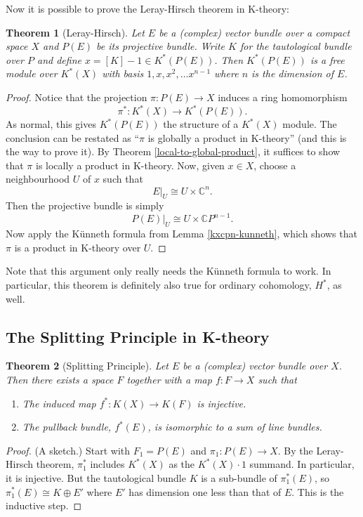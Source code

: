 \documentclass[a4paper,10pt]{article}
\theoremstyle{plain}%
\newtheorem{thm}{Theorem}
\theoremstyle{definition}
\theoremstyle{remark}
\newcommand{\CC}{\mathbb{C}}
\newcommand{\cp}{\CC P}   %
\newcommand{\CP}{\cp}     %
\begin{document}
Now it is possible to prove the Leray-Hirsch theorem in K-theory:
\begin{thm}[Leray-Hirsch]
  \label{leray-hirsch}
  Let $E$ be a (complex) vector bundle over a compact space $X$ and
  $P(E)$ be its projective bundle. Write $K$ for the tautological
  bundle over $P$ and define $x = [K] - 1 \in K^*(P(E))$. Then
  $K^*(P(E))$ is a free module over $K^*(X)$ with basis $1,x,x^2,\dots
  x^{n-1}$ where $n$ is the dimension of $E$.
\end{thm}
\begin{proof}
  Notice that the projection $\pi: P(E)\to X$ induces a ring
  homomorphism
  \begin{equation*}
    \pi^*: K^*(X)\to K^*(P(E)).
  \end{equation*}
  As normal, this gives $K^*(P(E))$ the structure of a $K^*(X)$
  module. The conclusion can be restated as ``$\pi$ is globally a
  product in K-theory'' (and this is the way to prove it). By Theorem
  \ref{local-to-global-product}, it suffices to show that $\pi$ is
  locally a product in K-theory. Now, given $x\in X$, choose a
  neighbourhood $U$ of $x$ such that
  \begin{equation*}
    E|_U \cong U \times \CC^n.
  \end{equation*}
  Then the projective bundle is simply
  \begin{equation*}
    P(E)|_U \cong U \times \CP^{n-1}.
  \end{equation*}
  Now apply the K\"unneth formula from Lemma \ref{kxcpn-kunneth},
  which shows that $\pi$ is a product in K-theory over $U$.
\end{proof}
Note that this argument only really needs the K\"unneth formula to
work. In particular, this theorem is definitely also true for ordinary
cohomology, $H^*$, as well.

\subsection{The Splitting Principle in K-theory}

\begin{thm}[Splitting Principle]
  Let $E$ be a (complex) vector bundle over $X$. Then there exists a
  space $F$ together with a map $f: F\to X$ such that
  \begin{enumerate}
  \item The induced map $f^*: K(X) \to K(F)$ is injective.
  \item The pullback bundle, $f^*(E)$, is isomorphic to a sum of line
    bundles.
  \end{enumerate}
\end{thm}
\begin{proof}
  (A sketch.) Start with $F_1 = P(E)$ and $\pi_1: P(E)\to X$. By the
  Leray-Hirsch theorem, $\pi_1^*$ includes $K^*(X)$ as the
  $K^*(X)\cdot 1$ summand. In particular, it is injective. But the
  tautological bundle $K$ is a sub-bundle of $\pi_1^*(E)$, so
  $\pi_1^*(E) \cong K\oplus E'$ where $E'$ has dimension one less than
  that of $E$. This is the inductive step.
\end{proof}
\end{document}
